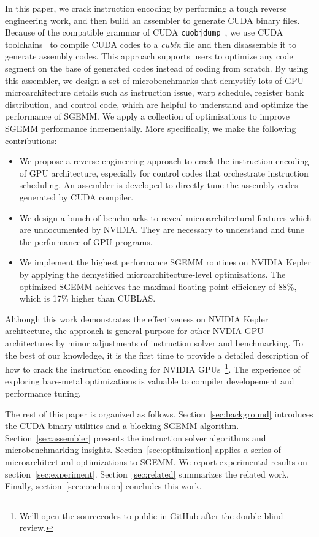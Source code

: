 In this paper, we crack instruction encoding by performing a tough reverse engineering work, and then build an assembler to generate CUDA binary files. Because of the compatible grammar of CUDA {\tt cuobjdump}~\cite{cubin2015util}, we use CUDA toolchains~\cite{nvcc} to compile CUDA codes to a {\em cubin} file and then disassemble it to generate assembly codes. This approach supports users to optimize any code segment on the base of generated codes instead of coding from scratch. By using this assembler, we design a set of microbenchmarks that demystify lots of GPU microarchitecture details such as instruction issue, warp schedule, register bank distribution, and control code, which are helpful to understand and optimize the performance of SGEMM. We apply a collection of optimizations to improve SGEMM performance incrementally. More specifically, we make the following contributions:
\begin{itemize}
\item We propose a reverse engineering approach to crack the instruction encoding of GPU architecture, especially for control codes that orchestrate instruction scheduling. An assembler is developed to directly tune the assembly codes generated by CUDA compiler.
\item We design a bunch of benchmarks to reveal microarchitectural features which are undocumented by NVIDIA. They are necessary to understand and tune the performance of GPU programs.
\item We implement the highest performance SGEMM routines on NVIDIA Kepler by applying the demystified microarchitecture-level optimizations. The optimized SGEMM achieves the maximal floating-point efficiency of 88\%, which is 17\% higher than CUBLAS.
\end{itemize}

Although this work demonstrates the effectiveness on NVIDIA Kepler architecture, the approach is general-purpose for other NVDIA GPU architectures by minor adjustments of instruction solver and benchmarking. To the best of our knowledge, it is the first time to provide a detailed description of how to crack the instruction encoding for NVIDIA GPUs~\footnote{We'll open the sourcecodes to public in GitHub after the double-blind review.}. The experience of exploring bare-metal optimizations is valuable to compiler developement and performance tuning.

The rest of this paper is organized as follows. Section~\ref{sec:background} introduces the CUDA binary utilities and a blocking SGEMM algorithm. Section~\ref{sec:assembler} presents the instruction solver algorithms and microbenchmarking insights. Section~\ref{sec:optimization} applies a series of microarchitectural optimizations to SGEMM. We report experimental results on section~\ref{sec:experiment}. Section~\ref{sec:related} summarizes the related work. Finally, section~\ref{sec:conclusion} concludes this work. 
